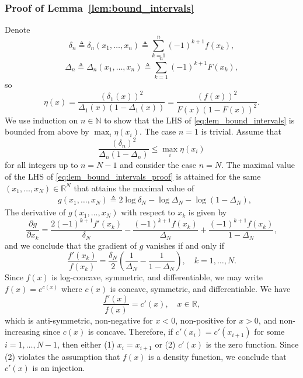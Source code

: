 \documentclass[letterpaper, 11pt]{IEEEtran}      %
\begin{document}
\subsubsection*{Proof of Lemma~\ref{lem:bound_intervals}} 
Denote 
\[
\delta_n \triangleq \delta_n(x_1,\ldots,x_n) \triangleq \sum_{k=1}^{n} (-1)^{k+1} f(x_k),
\]
\[
\Delta_n \triangleq \Delta_n(x_1,\ldots,x_n) \triangleq  \sum_{k=1}^n (-1)^{k+1} F(x_k),
\]
so 
\[
\eta(x) =  \frac{  \left(\delta_1(x) \right)^2}{\Delta_1(x)
(1-\Delta_1(x))}
= \frac{  \left( f (x) \right)^2}{ F(x)\left(1-F(x)\right)^2}. 
\]
We use induction on $n \in \mathbb N$ to show that the LHS of \eqref{eq:lem_bound_intervals} is bounded from above by $\max_i \eta(x_i)$. The case $n=1$ is trivial. Assume that 
\begin{equation}
\frac{ \left( \delta_n \right)^2} 
{\Delta_n \left(1- \Delta_n \right) } \leq \max_i \eta(x_i)
\label{eq:lem_bound_intervals_proof}
\end{equation}
for all integers up to $n = N-1$ and consider the case $n = N$. 
%
The maximal value of the LHS of \eqref{eq:lem_bound_intervals_proof} is attained for the same $(x_1,\ldots,x_N) \in \mathbb R^N$ that attains the maximal value of 
\begin{align*}
& g(x_1,\ldots, x_N) \triangleq  2 \log \delta_N -  \log \Delta_N -  \log \left(1 - \Delta_N  \right),
\end{align*}
 The derivative of $g(x_1,\ldots,x_N)$ with respect to $x_k$ is given by
\[
\frac{\partial  g}{\partial x_k} = \frac{2 (-1)^{k+1} f'(x_k)}{\delta_N} -\frac{(-1)^{k+1} f(x_k)}{\Delta_N } + \frac{(-1)^{k+1} f(x_k)}{1-\Delta_N },
\]
and we conclude that the gradient of $g$ vanishes if and only if
\begin{equation}
\label{eq:gradient_zero}
\frac{f'(x_k)}{f(x_k)} = \frac{\delta_N}{2} \left( \frac{1}{\Delta_N} - \frac{1}{1-\Delta_N} \right),\quad k=1,\ldots,N.
\end{equation}
%
Since $f(x)$ is log-concave, symmetric, and differentiable, we may write $f(x) = e^{c(x)}$ where $c(x)$ is concave, symmetric, and differentiable. We have 
\[
\frac{f'(x)}{f(x)} = c'(x), \quad x\in \mathbb R,
\]
which is anti-symmetric, non-negative for $x<0$,  non-positive for $x>0$, and non-increasing since $c(x)$ is concave. Therefore, if $c'(x_i) = c'(x_{i+1})$ for some $i =1,\ldots,N-1$, then either (1) $x_i = x_{i+1}$ or (2) $c'(x)$ is the zero function. Since (2) violates the assumption that $f(x)$ is a density function, we conclude that $c'(x)$ is an injection. 
%
\end{document}
